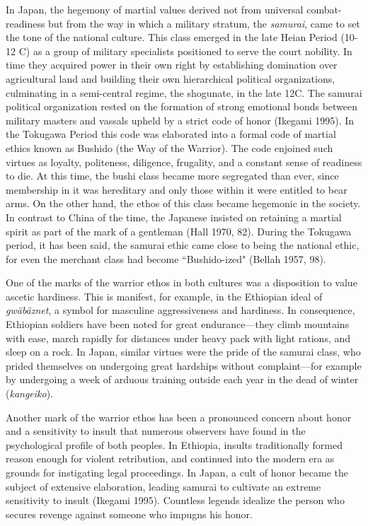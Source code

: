 In Japan, the hegemony of martial values derived not from universal combat-readiness but from the way in which a military stratum, the \emph{samurai}, came to set the tone of the national culture. This class emerged in the late Heian Period (10-12 C) as a group of military specialists positioned to serve the court nobility. In time they acquired power in their own right by establishing domination over agricultural land and building their own hierarchical political organizations, culminating in a semi-central regime, the shogunate, in the late 12C. The samurai political organization rested on the formation of strong emotional bonds between military masters and vassals upheld by a strict code of honor (Ikegami 1995). In the Tokugawa Period this code was elaborated into a formal code of martial ethics known as Bushido (the Way of the Warrior). The code enjoined such virtues as loyalty, politeness, diligence, frugality, and a constant sense of readiness to die. At this time, the bushi class became more segregated than ever, since membership in it was hereditary and only those within it were entitled to bear arms. On the other hand, the ethos of this class became hegemonic in the society. In contrast to China of the time, the Japanese insisted on retaining a martial spirit as part of the mark of a gentleman (Hall 1970, 82). During the Tokugawa period, it has been said, the samurai ethic came close to being the national ethic, for even the merchant class had become ``Bushido-ized" (Bellah 1957, 98). 

One of the marks of the warrior ethos in both cultures was a disposition to value ascetic hardiness. This is manifest, for example, in the Ethiopian ideal of \emph{gw\"{a}b\"{a}znet}, a symbol for masculine aggressiveness and hardiness. In consequence, Ethiopian soldiers have been noted for great endurance---they climb mountains with ease, march rapidly for distances under heavy pack with light rations, and sleep on a rock. In Japan, similar virtues were the pride of the samurai class, who prided themselves on undergoing great hardships without complaint---for example by undergoing a week of arduous training outside each year in the dead of winter (\emph{kangeiko}). 

Another mark of the warrior ethos has been a pronounced concern about honor and a sensitivity to insult that numerous observers have found in the psychological profile of both peoples. In Ethiopia, insults traditionally formed reason enough for violent retribution, and continued into the modern era as grounds for instigating legal proceedings. In Japan, a cult of honor became the subject of extensive elaboration, leading samurai to cultivate an extreme sensitivity to insult (Ikegami 1995). Countless legends idealize the person who secures revenge against someone who impugns his honor. 

